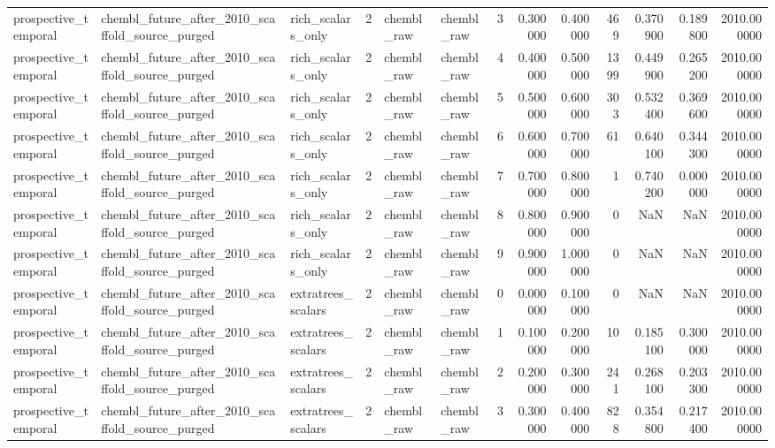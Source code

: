 \begin{longtable}{lllrllrrrrrrr}
prospective\_temporal & chembl\_future\_after\_2010\_scaffold\_source\_purged & rich\_scalars\_only & 2 & chembl\_raw & chembl\_raw & 3 & 0.300000 & 0.400000 & 469 & 0.370900 & 0.189800 & 2010.000000 \\
prospective\_temporal & chembl\_future\_after\_2010\_scaffold\_source\_purged & rich\_scalars\_only & 2 & chembl\_raw & chembl\_raw & 4 & 0.400000 & 0.500000 & 1399 & 0.449900 & 0.265200 & 2010.000000 \\
prospective\_temporal & chembl\_future\_after\_2010\_scaffold\_source\_purged & rich\_scalars\_only & 2 & chembl\_raw & chembl\_raw & 5 & 0.500000 & 0.600000 & 303 & 0.532400 & 0.369600 & 2010.000000 \\
prospective\_temporal & chembl\_future\_after\_2010\_scaffold\_source\_purged & rich\_scalars\_only & 2 & chembl\_raw & chembl\_raw & 6 & 0.600000 & 0.700000 & 61 & 0.640100 & 0.344300 & 2010.000000 \\
prospective\_temporal & chembl\_future\_after\_2010\_scaffold\_source\_purged & rich\_scalars\_only & 2 & chembl\_raw & chembl\_raw & 7 & 0.700000 & 0.800000 & 1 & 0.740200 & 0.000000 & 2010.000000 \\
prospective\_temporal & chembl\_future\_after\_2010\_scaffold\_source\_purged & rich\_scalars\_only & 2 & chembl\_raw & chembl\_raw & 8 & 0.800000 & 0.900000 & 0 & NaN & NaN & 2010.000000 \\
prospective\_temporal & chembl\_future\_after\_2010\_scaffold\_source\_purged & rich\_scalars\_only & 2 & chembl\_raw & chembl\_raw & 9 & 0.900000 & 1.000000 & 0 & NaN & NaN & 2010.000000 \\
prospective\_temporal & chembl\_future\_after\_2010\_scaffold\_source\_purged & extratrees\_scalars & 2 & chembl\_raw & chembl\_raw & 0 & 0.000000 & 0.100000 & 0 & NaN & NaN & 2010.000000 \\
prospective\_temporal & chembl\_future\_after\_2010\_scaffold\_source\_purged & extratrees\_scalars & 2 & chembl\_raw & chembl\_raw & 1 & 0.100000 & 0.200000 & 10 & 0.185100 & 0.300000 & 2010.000000 \\
prospective\_temporal & chembl\_future\_after\_2010\_scaffold\_source\_purged & extratrees\_scalars & 2 & chembl\_raw & chembl\_raw & 2 & 0.200000 & 0.300000 & 241 & 0.268100 & 0.203300 & 2010.000000 \\
prospective\_temporal & chembl\_future\_after\_2010\_scaffold\_source\_purged & extratrees\_scalars & 2 & chembl\_raw & chembl\_raw & 3 & 0.300000 & 0.400000 & 828 & 0.354800 & 0.217400 & 2010.000000 \\

\end{longtable}
